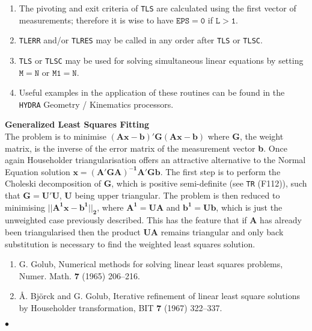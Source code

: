 \Notes
\begin{enumerate}
\item The pivoting and exit criteria of {\tt TLS} are calculated using
the first vector of measurements; therefore it is wise to have
$\mathtt{EPS=0}$ if $\mathtt{L>1}$.
\item {\tt TLERR} and/or {\tt TLRES} may be called in any order after
{\tt TLS} or {\tt TLSC}.
\item {\tt TLS} or {\tt TLSC} may be used for solving simultaneous linear
equations by setting $\mathtt{M=N}$ or $\mathtt{M1=N}$.
\item Useful examples in the application of these routines can
be found in the {\tt HYDRA} Geometry / Kinematics processors.
\end{enumerate}
\newpage
{\bf Generalized Least Squares Fitting} \\[3mm]
The problem is to minimise $\mathbf{(Ax-b)'G(Ax-b)}$ where {\bf G}, the
weight matrix, is the inverse of the error matrix of the
measurement vector {\bf b}. Once again Householder
triangularisation offers an attractive alternative to the Normal
Equation solution $\mathbf{x=(A'GA)^{-1} A'Gb}$.
The first step is to perform the Choleski decomposition of {\bf G},
which is positive semi-definite (see {\tt TR} (F112)), such that
$\mathbf{G=U'U}$, {\bf U} being upper triangular. The
problem is then reduced to minimising $\mathbf{||A^1x-b^1||_2}$,
where $\mathbf{A^1=UA}$ and $\mathbf{b^1=Ub}$,
which is just the unweighted case previously described. This has the
feature that if {\bf A} has already been triangularised then the product
{\bf UA} remains triangular and only back substitution is necessary to
find the weighted least squares solution.
\Refer
\begin{enumerate}
\item G. Golub, Numerical methods for solving linear least squares
problems, Numer. Math. {\bf 7} (1965)  206--216.
\item {\AA}. Bj\"orck and G. Golub, Iterative refinement of linear least
square solutions by Householder transformation, BIT {\bf 7} (1967)
322--337.
\end{enumerate}
$\bullet$

